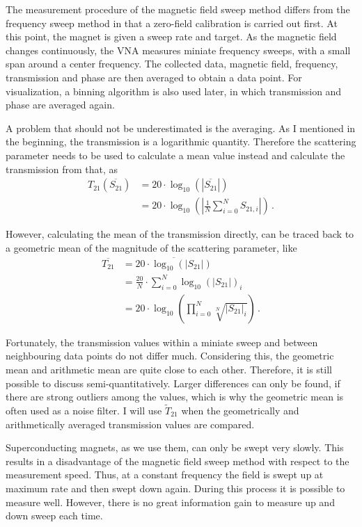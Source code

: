 The measurement procedure of the magnetic field sweep method differs from the frequency sweep method in that a zero-field calibration is carried out first. At this point, the magnet is given a sweep rate and target. As the magnetic field changes continuously, the VNA measures miniate frequency sweeps, with a small span around a center frequency.  The collected data, magnetic field, frequency, transmission and phase are then averaged to obtain a data point. For visualization, a binning algorithm is also used later, in which transmission and phase are averaged again.

A problem that should not be underestimated is the averaging. As I mentioned in the beginning, the transmission is a logarithmic quantity. Therefore the scattering parameter needs to be used to calculate a mean value instead and calculate the transmission from that, as
\begin{align}
    T_{21}\left(\overline{S_{21}}\right) &= 20\cdot \log_{10} \left( |\overline{S_{21}}|\right) \\
    &= 20\cdot \log_{10} \left( \left|\frac{1}{N}\sum_{i=0}^N{S_{21,i}}\right|\right)\,.
\end{align}

However, calculating the mean of the transmission directly, can be traced back to a geometric mean of the magnitude of the scattering parameter, like
\begin{align}
    \overline{T_{21}}&= \overline{20\cdot \log_{10} \left( \left|{S_{21}}\right|\right)}\\
    &= \frac{20}{N}\cdot \sum_{i=0}^N\log_{10} \left( \left|{S_{21}}\right|\right)_i\\
    &= 20 \cdot \log_{10} \left( \prod
    _{i=0}^N\sqrt[N]{\left|{S_{21}}\right|_i}\right)\,.
\end{align}

Fortunately, the transmission values within a miniate sweep and between neighbouring data points do not differ much. Considering this, the geometric mean and arithmetic mean are quite close to each other. Therefore, it is still possible to discuss semi-quantitatively. Larger differences can only be found, if there are strong outliers among the values, which is why the geometric mean is often used as a noise filter. I will use $\widetilde{T}_{21}$ when the geometrically and arithmetically averaged transmission values are compared. \cite{gonzalez2008}

Superconducting magnets, as we use them, can only be swept very slowly. This results in a disadvantage of the magnetic field sweep method with respect to the measurement speed. Thus, at a constant frequency the field is swept up at maximum rate and then swept down again. During this process it is possible to measure well. However, there is no great information gain to measure up and down sweep each time.

